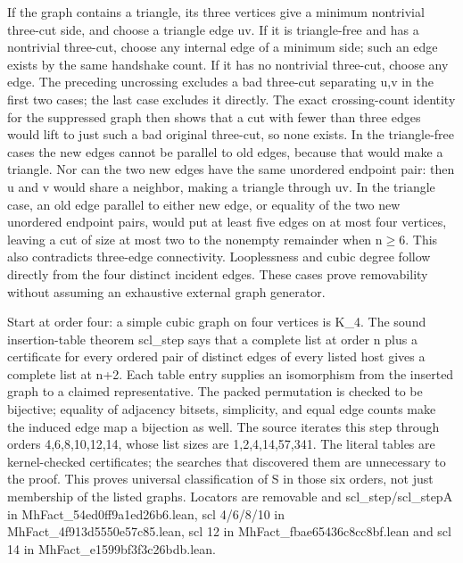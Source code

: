 \documentclass[11pt,a4paper]{article}
\begin{document}
If the graph contains a triangle, its three vertices give a minimum nontrivial three-cut side, and choose a triangle edge uv. If it is triangle-free and has a nontrivial three-cut, choose any internal edge of a minimum side; such an edge exists by the same handshake count. If it has no nontrivial three-cut, choose any edge. The preceding uncrossing excludes a bad three-cut separating u,v in the first two cases; the last case excludes it directly. The exact crossing-count identity for the suppressed graph then shows that a cut with fewer than three edges would lift to just such a bad original three-cut, so none exists. In the triangle-free cases the new edges cannot be parallel to old edges, because that would make a triangle. Nor can the two new edges have the same unordered endpoint pair: then u and v would share a neighbor, making a triangle through uv. In the triangle case, an old edge parallel to either new edge, or equality of the two new unordered endpoint pairs, would put at least five edges on at most four vertices, leaving a cut of size at most two to the nonempty remainder when n\ensuremath{\geq}6. This also contradicts three-edge connectivity. Looplessness and cubic degree follow directly from the four distinct incident edges. These cases prove removability without assuming an exhaustive external graph generator.

Start at order four: a simple cubic graph on four vertices is K\_4. The sound insertion-table theorem scl\_step says that a complete list at order n plus a certificate for every ordered pair of distinct edges of every listed host gives a complete list at n+2. Each table entry supplies an isomorphism from the inserted graph to a claimed representative. The packed permutation is checked to be bijective; equality of adjacency bitsets, simplicity, and equal edge counts make the induced edge map a bijection as well. The source iterates this step through orders 4,6,8,10,12,14, whose list sizes are 1,2,4,14,57,341. The literal tables are kernel-checked certificates; the searches that discovered them are unnecessary to the proof. This proves universal classification of S in those six orders, not just membership of the listed graphs. Locators are removable and scl\_step/scl\_stepA in MhFact\_54ed0ff9a1ed26b6.lean, scl 4/6/8/10 in MhFact\_4f913d5550e57c85.lean, scl 12 in MhFact\_fbae65436c8cc8bf.lean and scl 14 in MhFact\_e1599bf3f3c26bdb.lean.
\end{document}

